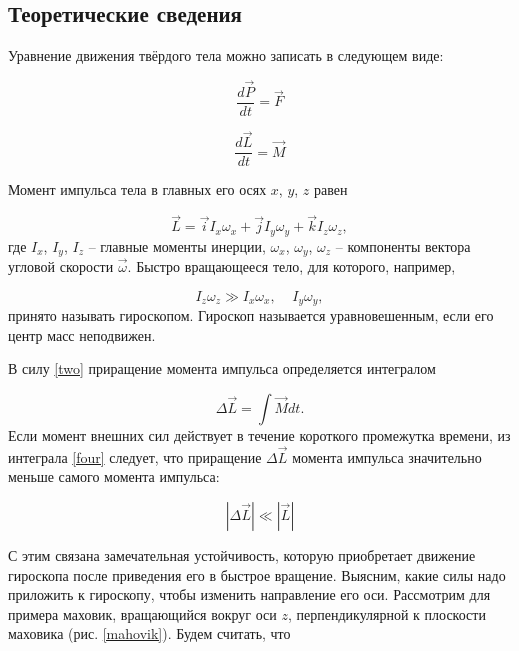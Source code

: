 \documentclass[a4paper, 12pt]{article}
\begin{document}
    \bigskip
    \begin{center}
        \subsection*{Теоретические сведения}
        Уравнение движения твёрдого тела можно записать в следующем виде:

\begin{equation}
\frac{d\vec{P}}{dt}=\vec{F}
\label{one}
\end{equation}

\begin{equation}
\frac{d\vec{L}}{dt}=\vec{M}
\label{two}
\end{equation}

Момент импульса тела в главных его осях $x$, $y$, $z$ равен

\begin{equation}
\vec{L} = \vec{i}I_x\omega_x+\vec{j}I_y\omega_y+\vec{k}I_z\omega_z,
\label{three}
\end{equation}
где $ I_x $, $ I_y $, $ I_z $ -- главные моменты инерции, $ \omega_x $, $ \omega_y $, $ \omega_z $ -- компоненты вектора угловой скорости $ \vec{\omega} $. Быстро вращающееся тело, для которого, например,

\begin{equation}
I_z\omega_z \gg I_x\omega_x,\;\;\;\;I_y\omega_y,
\end{equation} 
принято называть гироскопом. Гироскоп называется уравновешенным, если его центр масс неподвижен.

В силу \eqref{two} приращение момента импульса определяется интегралом

\begin{equation}
\Delta\vec{L} = \int\vec{M} dt.
\label{four}
\end{equation}
Если момент внешних сил действует в течение короткого промежутка времени, из интеграла \eqref{four} следует, что приращение $ \Delta \vec{L} $ момента импульса значительно меньше самого момента импульса:

\begin{equation}
\left|\Delta \vec{L}\right| \ll \left|\vec{L}\right| 
\end{equation}

С этим связана замечательная устойчивость, которую приобретает движение гироскопа после приведения его в быстрое вращение. 
Выясним, какие силы надо приложить к гироскопу, чтобы изменить 
направление его оси. Рассмотрим для 
примера маховик, вращающийся вокруг оси $ z $, перпендикулярной к плоскости маховика (рис. \ref{mahovik}). Будем считать, что


\end{center}
\end{document}
